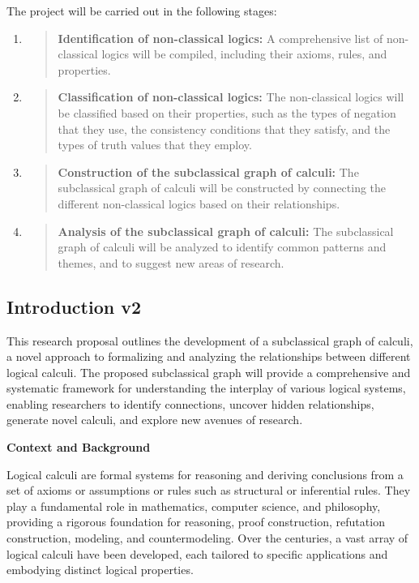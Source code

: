 The project will be carried out in the following stages:

\begin{enumerate}
\def\labelenumi{\arabic{enumi}.}
\item
  \begin{quote}
  \textbf{Identification of non-classical logics:} A comprehensive list
  of non-classical logics will be compiled, including their axioms,
  rules, and properties.
  \end{quote}
\item
  \begin{quote}
  \textbf{Classification of non-classical logics:} The non-classical
  logics will be classified based on their properties, such as the types
  of negation that they use, the consistency conditions that they
  satisfy, and the types of truth values that they employ.
  \end{quote}
\item
  \begin{quote}
  \textbf{Construction of the subclassical graph of calculi:} The
  subclassical graph of calculi will be constructed by connecting the
  different non-classical logics based on their relationships.
  \end{quote}
\item
  \begin{quote}
  \textbf{Analysis of the subclassical graph of calculi:} The
  subclassical graph of calculi will be analyzed to identify common
  patterns and themes, and to suggest new areas of research.
  \end{quote}
\end{enumerate}

\hypertarget{introduction-v2}{%
\subsection{Introduction v2}\label{introduction-v2}}

This research proposal outlines the development of a subclassical graph
of calculi, a novel approach to formalizing and analyzing the
relationships between different logical calculi. The proposed
subclassical graph will provide a comprehensive and systematic framework
for understanding the interplay of various logical systems, enabling
researchers to identify connections, uncover hidden relationships,
generate novel calculi, and explore new avenues of research.

\textbf{Context and Background}

Logical calculi are formal systems for reasoning and deriving
conclusions from a set of axioms or assumptions or rules such as
structural or inferential rules. They play a fundamental role in
mathematics, computer science, and philosophy, providing a rigorous
foundation for reasoning, proof construction, refutation construction,
modeling, and countermodeling. Over the centuries, a vast array of
logical calculi have been developed, each tailored to specific
applications and embodying distinct logical properties.

